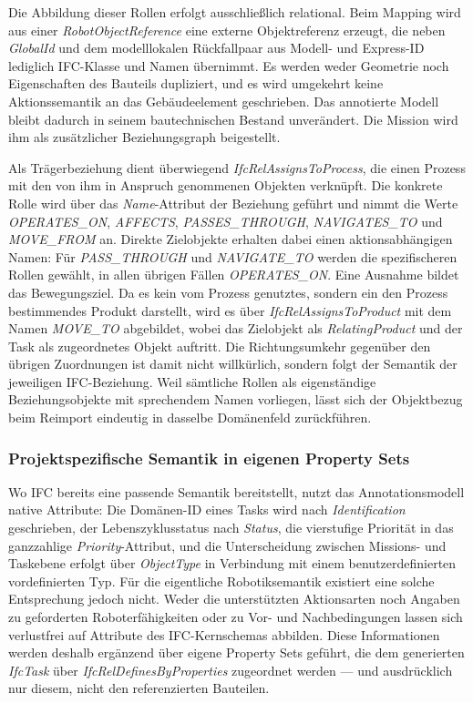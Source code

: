 Die Abbildung dieser Rollen erfolgt ausschließlich relational. Beim Mapping wird aus einer
\textit{RobotObjectReference} eine externe Objektreferenz erzeugt, die neben \textit{GlobalId} und
dem modelllokalen Rückfallpaar aus Modell- und Express-ID lediglich IFC-Klasse und Namen übernimmt.
Es werden weder Geometrie noch Eigenschaften des Bauteils dupliziert, und es wird umgekehrt keine
Aktionssemantik an das Gebäudeelement geschrieben. Das annotierte Modell bleibt dadurch in seinem
bautechnischen Bestand unverändert. Die Mission wird ihm als zusätzlicher Beziehungsgraph
beigestellt.

Als Trägerbeziehung dient überwiegend \textit{IfcRelAssignsToProcess}, die einen Prozess mit den von
ihm in Anspruch genommenen Objekten verknüpft. Die konkrete Rolle wird über das
\textit{Name}-Attribut der Beziehung geführt und nimmt die Werte \textit{OPERATES\_ON},
\textit{AFFECTS}, \textit{PASSES\_THROUGH}, \textit{NAVIGATES\_TO} und \textit{MOVE\_FROM} an.
Direkte Zielobjekte erhalten dabei einen aktionsabhängigen Namen: Für \textit{PASS\_THROUGH} und
\textit{NAVIGATE\_TO} werden die spezifischeren Rollen gewählt, in allen übrigen Fällen
\textit{OPERATES\_ON}. Eine Ausnahme bildet das Bewegungsziel. Da es kein vom Prozess genutztes,
sondern ein den Prozess bestimmendes Produkt darstellt, wird es über \textit{IfcRelAssignsToProduct}
mit dem Namen \textit{MOVE\_TO} abgebildet, wobei das Zielobjekt als \textit{RelatingProduct} und
der Task als zugeordnetes Objekt auftritt. Die Richtungsumkehr gegenüber den übrigen Zuordnungen ist
damit nicht willkürlich, sondern folgt der Semantik der jeweiligen IFC-Beziehung. Weil sämtliche
Rollen als eigenständige Beziehungsobjekte mit sprechendem Namen vorliegen, lässt sich der
Objektbezug beim Reimport eindeutig in dasselbe Domänenfeld zurückführen.

\subsubsection{Projektspezifische Semantik in eigenen Property Sets}
Wo IFC bereits eine passende Semantik bereitstellt, nutzt das Annotationsmodell native Attribute:
Die Domänen-ID eines Tasks wird nach \textit{Identification} geschrieben, der Lebenszyklusstatus
nach \textit{Status}, die vierstufige Priorität in das ganzzahlige \textit{Priority}-Attribut, und
die Unterscheidung zwischen Missions- und Taskebene erfolgt über \textit{ObjectType} in Verbindung
mit einem benutzerdefinierten vordefinierten Typ. Für die eigentliche Robotiksemantik existiert eine
solche Entsprechung jedoch nicht. Weder die unterstützten Aktionsarten noch Angaben zu geforderten
Roboterfähigkeiten oder zu Vor- und Nachbedingungen lassen sich verlustfrei auf Attribute des
IFC-Kernschemas abbilden. Diese Informationen werden deshalb ergänzend über eigene Property Sets
geführt, die dem generierten \textit{IfcTask} über \textit{IfcRelDefinesByProperties} zugeordnet
werden — und ausdrücklich nur diesem, nicht den referenzierten Bauteilen.

